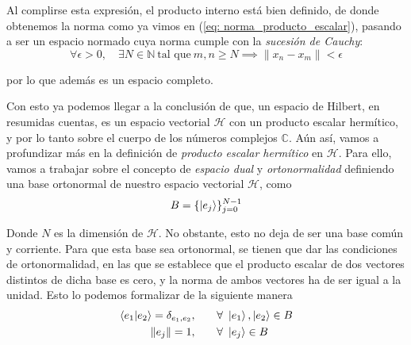 \documentclass[12pt]{article}
\numberwithin{equation}{section} %
\begin{document}
    \vspace{1.5mm}

    Al complirse esta expresión, el producto interno está bien definido, de donde obtenemos la norma como ya vimos en (\ref{eq: norma_producto_escalar}), pasando a ser un espacio normado cuya norma cumple con la \textit{sucesión de Cauchy}:
    \begin{equation*}
        \forall \epsilon > 0, \quad \exists N \in \mathbb{N} \ \text{tal que} \ m, n \geq N \implies \| x_{n} - x_{m} \| < \epsilon
    \end{equation*}
    
    \vspace{1.5mm}

    por lo que además es un espacio completo.

    \vspace{5mm}

    Con esto ya podemos llegar a la conclusión de que, un espacio de Hilbert, en resumidas cuentas, es un espacio vectorial \( \mathcal{H} \) con un producto escalar hermítico, y por lo tanto sobre el cuerpo de los números complejos \( \mathbb{C} \). Aún así, vamos a profundizar más en la definición de \textit{producto escalar hermítico} en \( \mathcal{H} \). Para ello, vamos a trabajar sobre el concepto de \textit{espacio dual} y \textit{ortonormalidad} definiendo una base ortonormal de nuestro espacio vectorial \( \mathcal{H} \), como
    \begin{equation}
        B = \{ \ket{e_{j}} \} _{j = 0}^{N - 1}
        \label{eq: base_ortonormal_H}
    \end{equation}

    \vspace{1.5mm}

    Donde \( N \) es la dimensión de \( \mathcal{H} \). No obstante, esto no deja de ser una base común y corriente. Para que esta base sea ortonormal, se tienen que dar las condiciones de ortonormalidad, en las que se establece que el producto escalar de dos vectores distintos de dicha base es cero, y la norma de ambos vectores ha de ser igual a la unidad. Esto lo podemos formalizar de la siguiente manera
    \begin{align}
        \braket{e_{1} | e_{2}} = \delta_{e_{1}, e_{2}}, \qquad &\forall \ \ket{e_{1}}, \ket{e_{2}} \in B \label{eq: ortonormalidad} \\
        \| e_{j} \| = 1,  \qquad &\forall \ \ket{e_{j}} \in B \label{eq: linealidad}
    \end{align}
    
\end{document}
